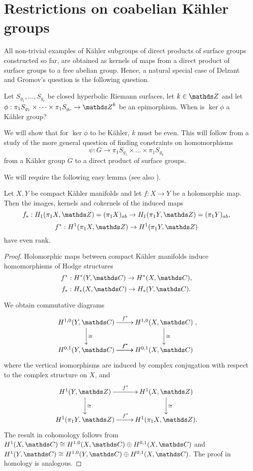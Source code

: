 \section{Restrictions on coabelian K\"ahler groups}
\label{secResCoabKGs}

All non-trivial examples of K\"ahler subgroups of direct products of surface groups constructed so far, are obtained as kernels of maps from a direct product of surface groups to a free abelian group. Hence, a natural special case of Delzant and Gromov's question is the following question.

\begin{question}
 Let $S_{g_1},\dots, S_{g_r}$ be closed hyperbolic Riemann surfaces, let $k\in \ZZ$ and let $\phi: \pi_1 S_{g_1}\times\dots \times \pi_1 S_{g_r}\to \ZZ^k$ be an epimorphism. When is $\ker \phi$ a K\"ahler group?
\end{question}

We will show that for $\ker \phi$ to be K\"ahler, $k$ must be even. This will follow from a study of the more general question of finding constraints on homomorphisms
\[
 \psi: G \rightarrow \pi_1 S_{g_1} \times \dots \times \pi_1 S_{g_k}
\]
from a K\"ahler group $G$ to a direct product of surface groups.

We will require the following easy lemma (see also \cite[Lemma 2.1]{Ara-11}).

\begin{lemma}
Let $X,Y$ be compact K\"ahler manifolds and let $f:X\rightarrow Y$ be a holomorphic map. Then the images, kernels and cokernels of the induced maps
\[
 f_{\ast} : H_1(\pi_1 X,\ZZ)=(\pi_1 X)_{ab} \rightarrow H_1(\pi_1 Y, \ZZ)=(\pi_1 Y)_{ab},
\]
\[
f^{\ast}: H^1(\pi_1 X,\ZZ) \rightarrow H^1(\pi_1Y,\ZZ)
\]
have even rank.
\label{lemHodgeHol}
\end{lemma}

\begin{proof}
Holomorphic maps between compact K\"ahler manifolds induce homomorphisms of Hodge structures
\[
 f^{\ast}: H^{\ast}(Y,\CC)\rightarrow H^{\ast}(X,\CC),
\]
\[
f_{\ast} : H_{\ast}(X,\CC)\rightarrow H_{\ast}(Y,\CC).
\]

We obtain commutative diagrams
\[
 \xymatrix{ H^{1,0}(Y,\CC)\ar[r]^{f^{\ast}}\ar[d]^{\cong} & H^{1,0}(X,\CC)\ar[d]^{\cong}\\
 			H^{0,1}(Y,\CC)\ar[r]^{f^{\ast}}\ar[r]^{f^{\ast}} & H^{0,1}(X,\CC)},
\]
where the vertical isomorphisms are induced by complex conjugation with respect to the complex structure on $X$, and
\[
 \xymatrix{ H^1(Y,\ZZ)\ar[r]^{f^{\ast}}\ar[d]^{\cong}& H^1(X,\ZZ)\ar[d]^{\cong}\\
 			H^1(\pi_1Y,\ZZ)\ar[r]^{f^{\ast}} &H^1(\pi_1 X,\ZZ).}
\]
The result in cohomology follows from $H^1(X,\CC)\cong H^{1,0}(X,\CC)\oplus H^{0,1}(X,\CC)$ and $H^1(Y,\CC)\cong H^{1,0}(Y,\CC)\oplus H^{0,1}(X,\CC)$. The proof in homology is analogous.
\end{proof}

